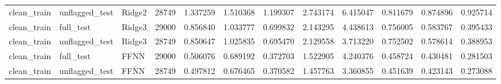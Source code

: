 \begin{tabular}{lllrrrrrrrrr}
clean_train & unflagged_test & Ridge2 & 28749 & 1.337259 & 1.510368 & 1.199307 & 2.743174 & 6.415047 & 0.811679 & 0.874896 & 0.925714 \\
clean_train & full_test & Ridge3 & 29000 & 0.856840 & 1.033777 & 0.699832 & 2.143295 & 4.438613 & 0.756005 & 0.583767 & 0.395433 \\
clean_train & unflagged_test & Ridge3 & 28749 & 0.850647 & 1.025835 & 0.695470 & 2.129558 & 3.713220 & 0.752502 & 0.578614 & 0.388953 \\
clean_train & full_test & FFNN & 29000 & 0.506076 & 0.689192 & 0.372703 & 1.522905 & 4.240376 & 0.458724 & 0.430481 & 0.281503 \\
clean_train & unflagged_test & FFNN & 28749 & 0.497812 & 0.676465 & 0.370582 & 1.457763 & 3.360855 & 0.451639 & 0.423143 & 0.273088 \\
\bottomrule
\end{tabular}
